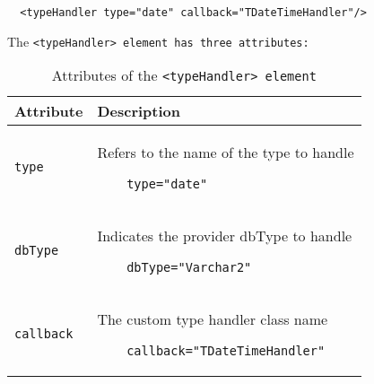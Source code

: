 \begin{verbatim}
  <typeHandler type="date" callback="TDateTimeHandler"/>
\end{verbatim}

The \tt{<typeHandler>} element has three attributes:
\begin{table}[!hpt]
\caption{Attributes of the \tt{<typeHandler>} element} \label{table:4.5}
\centering
\begin{tabular}{|l|l|}
 \hline
 \textbf{Attribute} & \textbf{Description} \\
 \hline
%
 \tt{type} &
 \begin{minipage}{0.7\textwidth}\vspace{2mm}
    Refers to the name of the type to handle
    \vspace{-3mm}\begin{verbatim}
    type="date"
    \end{verbatim}\vspace{-5mm}
  \end{minipage}
  \\
  \hline
%
 \tt{dbType} &
 \begin{minipage}{0.7\textwidth}\vspace{2mm}
    Indicates the provider dbType to handle
    \vspace{-3mm}\begin{verbatim}
    dbType="Varchar2"
    \end{verbatim}\vspace{-5mm}
  \end{minipage}
  \\
  \hline
%
 \tt{callback} &
 \begin{minipage}{0.7\textwidth}\vspace{2mm}
   The custom type handler class name
    \vspace{-3mm}\begin{verbatim}
    callback="TDateTimeHandler"
    \end{verbatim}\vspace{-5mm}
  \end{minipage}
  \\
  \hline
\end{tabular}
\end{table}


